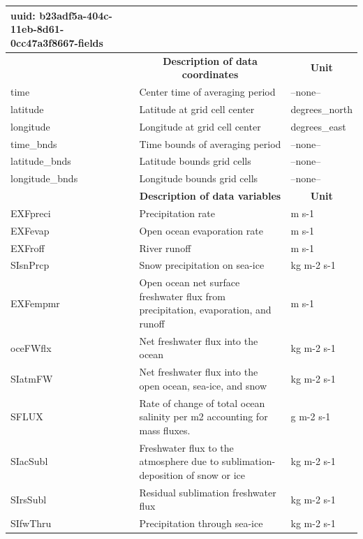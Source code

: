 \begin{longtable}{|m{}|m{}|m{}|}
{    uuid:                         b23adf5a-404c-11eb-8d61-0cc47a3f8667-fields} \\ 
\hline \endhead \hline \endfoot
\rowcolor{lightgray} \multicolumn{1}{|c|}{\textbf{Coordinates}} & \multicolumn{1}{|c|}{\textbf{Description of data coordinates}} &  \multicolumn{1}{|c|}{\textbf{Unit}}\\ \hline
time &Center time of averaging period &--none--  \\ \hline
latitude &Latitude at grid cell center &degrees\_north  \\ \hline
longitude &Longitude at grid cell center &degrees\_east  \\ \hline
time\_bnds &Time bounds of averaging period &--none--  \\ \hline
latitude\_bnds &Latitude bounds grid cells &--none--  \\ \hline
longitude\_bnds &Longitude bounds grid cells &--none--  \\ \hline
\rowcolor{lightgray} \multicolumn{1}{|c|}{\textbf{Variables}} & \multicolumn{1}{|c|}{\textbf{Description of data variables}} &  \multicolumn{1}{|c|}{\textbf{Unit}}\\ \hline
EXFpreci &Precipitation rate &m s-1  \\ \hline
EXFevap &Open ocean evaporation rate &m s-1  \\ \hline
EXFroff &River runoff &m s-1  \\ \hline
SIsnPrcp &Snow precipitation on sea-ice &kg m-2 s-1  \\ \hline
EXFempmr &Open ocean net surface freshwater flux from precipitation, evaporation, and runoff &m s-1  \\ \hline
oceFWflx &Net freshwater flux into the ocean &kg m-2 s-1  \\ \hline
SIatmFW &Net freshwater flux into the open ocean, sea-ice, and snow &kg m-2 s-1  \\ \hline
SFLUX &Rate of change of total ocean salinity per m2 accounting for mass fluxes. &g m-2 s-1  \\ \hline
SIacSubl &Freshwater flux to the atmosphere due to sublimation-deposition of snow or ice &kg m-2 s-1  \\ \hline
SIrsSubl &Residual sublimation freshwater flux &kg m-2 s-1  \\ \hline
SIfwThru &Precipitation through sea-ice &kg m-2 s-1  \\ \hline
\end{longtable}

\newp
\pagebreak
